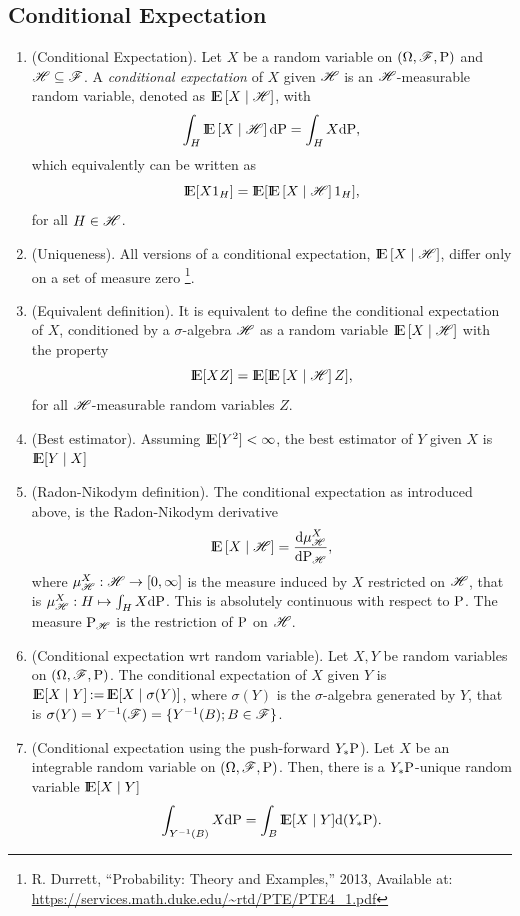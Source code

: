 \documentclass[a4paper,10pt]{scrbook}
\newcommand{\ce}[1]{\E\left[#1 {}\mid{} \HH \right]}
\begin{document}
\subsection{Conditional Expectation}
\begin{enumerate}
 \item (Conditional Expectation). Let $X$ be a random variable on $(\Omega,\mathscr{F},\mathrm{P})$ and $\mathscr{H}\subseteq \mathscr{F}$.
       A \textit{conditional expectation} of $X$ given $\mathscr{H}$ is an $\mathscr{H}$-measurable 
       random variable, denoted as $\ce{X}$, with
       \[
        \int_H \ce{X} \d\prob = \int_H X\d\prob,
       \]
       which equivalently can be written as
       \[
        \E[X 1_H] = \E[\ce{X}1_H],
       \]
       for all $H\in\mathscr{H}$.
 \item (Uniqueness). All versions of a conditional expectation, $\ce{X}$, differ only on a 
       set of measure zero%
       \footnote{R. Durrett, ``Probability: Theory and Examples,'' 2013, Available at: \url{https://services.math.duke.edu/~rtd/PTE/PTE4_1.pdf}}.
 \item (Equivalent definition). It is equivalent to define the conditional expectation of $X$, 
       conditioned by a $\sigma$-algebra $\mathscr{H}$ as a random variable $\ce{X}$ with the property
       \[
        \E[X Z] = \E[\ce{X}Z],
       \]
       for all $\mathscr{H}$-measurable random variables $Z$.
 \item (Best estimator). Assuming $\E[Y^2]<\infty$, the best estimator of $Y$ given $X$ is $\E[Y{}\mid{}X]$      
 \item (Radon-Nikodym definition). The conditional expectation as introduced above, is the Radon-Nikodym
       derivative
       \[
          \ce{X} = \frac{\d \mu^X_{\HH}}{\d \prob_{\HH}},
       \]
      where $\mu^X_{\mathscr{H}}:\mathscr{H}\to [0,\infty]$ is the measure induced by $X$
      restricted on $\mathscr{H}$, that is $\mu^X_{\mathscr{H}}:H\mapsto \int_H X\mathrm{d}\mathrm{P}$.
      This is absolutely continuous with respect to $\mathrm{P}$. The measure $\mathrm{P}_{\mathscr{H}}$
      is the restriction of $\mathrm{P}$ on $\mathscr{H}$. 
      
 \item (Conditional expectation wrt random variable). Let $X,Y$ be random variables on $(\Omega,\mathscr{F},\mathrm{P})$.
       The conditional expectation of $X$ given $Y$ is $\E[X\mid Y]\dfn \E[X\mid \sigma(Y)]$,
       where $\sigma(Y)$ is the $\sigma$-algebra generated by $Y$, that is 
       $\sigma(Y) = Y^{-1}(\mathscr{F}) = \{Y^{-1}(B); B\in\mathscr{F}\}$.
       
 \item (Conditional expectation using the push-forward $Y_*\mathrm{P}$). 
       Let $X$ be an integrable random variable on $(\Omega,\mathscr{F},\mathrm{P})$. Then, there is a $Y_*\mathrm{P}$-unique 
       random variable $\E[X\mid Y]$
       \[
        \int_{Y^{-1}(B)} X\d \prob = \int_B \E[X{}\mid{}Y]\d(Y_*\prob).
       \]


\end{enumerate}
\end{document}
